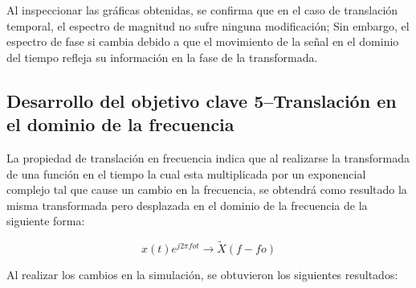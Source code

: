 \documentclass[11pt,letterpaper,twocolumn]{article}
\begin{document}
        Al inspeccionar las gráficas obtenidas, se confirma que en el caso de translación temporal, el espectro de magnitud no sufre ninguna modificación; Sin embargo, el espectro de fase si cambia debido a que el movimiento de la señal en el dominio del tiempo refleja su información en la fase de la transformada.
        
    \subsection{Desarrollo del objetivo clave 5--Translación en el dominio de la frecuencia}
        La propiedad de translación en frecuencia indica que al realizarse la transformada de una función en el tiempo la cual esta multiplicada por un exponencial complejo tal que cause un cambio en la frecuencia, se obtendrá como resultado la misma transformada pero desplazada en el dominio de la frecuencia de la siguiente forma: 
        
        \begin{equation}
            {x}(t)e^{j2 \pi fot} \rightarrow \tilde{X}(f-fo)
            \label{TFrecuencia}
        \end{equation}
        
        Al realizar los cambios en la simulación, se obtuvieron los siguientes resultados:
        
\end{document}
